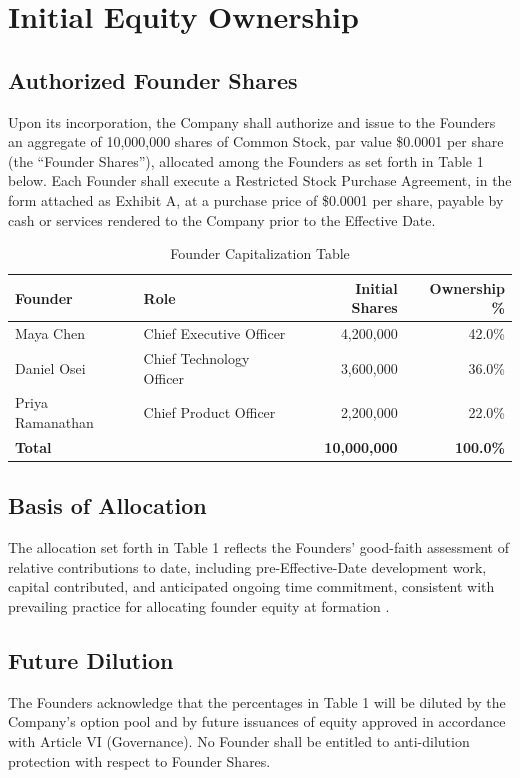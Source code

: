 \section{Initial Equity Ownership}

\subsection{Authorized Founder Shares} Upon its incorporation, the Company shall authorize and issue to the Founders an aggregate of 10,000,000 shares of Common Stock, par value \$0.0001 per share (the ``Founder Shares''), allocated among the Founders as set forth in Table 1 below. Each Founder shall execute a Restricted Stock Purchase Agreement, in the form attached as Exhibit A, at a purchase price of \$0.0001 per share, payable by cash or services rendered to the Company prior to the Effective Date.

\begin{table}[h]
  \centering
  \caption{Founder Capitalization Table}
  \label{tab:captable}
  \begin{tabularx}{\textwidth}{l X r r}
    \toprule
    \textbf{Founder} & \textbf{Role} & \textbf{Initial Shares} & \textbf{Ownership \%} \\
    \midrule
    Maya Chen & Chief Executive Officer & 4,200,000 & 42.0\% \\
    Daniel Osei & Chief Technology Officer & 3,600,000 & 36.0\% \\
    Priya Ramanathan & Chief Product Officer & 2,200,000 & 22.0\% \\
    \midrule
    \textbf{Total} & & \textbf{10,000,000} & \textbf{100.0\%} \\
    \bottomrule
  \end{tabularx}
\end{table}

\subsection{Basis of Allocation} The allocation set forth in Table 1 reflects the Founders' good-faith assessment of relative contributions to date, including pre-Effective-Date development work, capital contributed, and anticipated ongoing time commitment, consistent with prevailing practice for allocating founder equity at formation \cite{wasserman2012equity}.

\subsection{Future Dilution} The Founders acknowledge that the percentages in Table 1 will be diluted by the Company's option pool and by future issuances of equity approved in accordance with Article VI (Governance). No Founder shall be entitled to anti-dilution protection with respect to Founder Shares.

